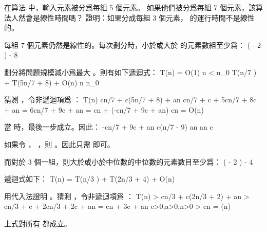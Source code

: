 \startsection[
  title={Selection in worst-case linear time},
  reference=section:worstcase_linear_selection,
]

\startEXERCISE
在算法  中，輸入元素被分爲每組 5 個元素。
如果他們被分爲每組 7 個元素，該算法人然會是線性時間嗎？
證明：如果分成每組 3 個元素，  的運行時間不是線性的。
\stopEXERCISE

\startANSWER
每組 7 個元素仍然是線性的。每次劃分時，小於或大於  的元素數組至少爲：
 \left(\left\lceil {} \left\lceil {} \right\rceil \right\rceil
           - 2 \right) \ge {} - 8
\stopformula

劃分將問題規模減小爲最大 。則有如下遞迴式：
\startformula
T(n) = \startmathcases
 \NC O(1) \MC {} n < n_0 \NR
 \NC T(\lceil n/7 \rceil) + T(5n/7 + 8) + O(n) \MC {} n \ge n_0 \NR
\stopmathcases
\stopformula

猜測 ，令非遞迴項爲 ：
\startformula\startmathalignment
\NC T(n) \NC \le c\lceil n/7 \rceil + c(5n/7 + 8) + an \NR
\NC \NC \le cn/7 + c + 5cn/7 + 8c + an \NR
\NC \NC = 6cn/7 + 9c + an \NR
\NC \NC = cn + (-cn/7 + 9c + an) \NR
\NC \NC \le cn \NR
\NC \NC = O(n) \NR
\stopmathalignment\stopformula

當  時，最後一步成立。因此：
\startformula\startmathalignment[n=1]
\NC -cn/7 + 9c + an  \NR
\NC \Downarrow \NR
\NC c(n/7 - 9) \ge an \NR
\NC \Downarrow \NR
\NC {} \ge an \NR
\NC \Downarrow \NR
\NC c \ge {} \NR
\stopmathalignment\stopformula

如果令 ， ，則 。因此只需  即可。

而對於 3 個一組，則大於或小於中位數的中位數的元素數目至少爲：
 \left(\left\lceil {} \left\lceil {} \right\rceil \right\rceil
           - 2 \right) \ge {} - 4
\stopformula

遞迴式如下：
\startformula
T(n) = T(\lceil n/3 \rceil) + T(2n/3 + 4) + O(n)
\stopformula

用代入法證明 。猜測 ，令非遞迴項爲 ：
\startformula\startmathalignment
\NC T(n) \NC > c\lceil n/3 \rceil + c(2n/3 + 2) + an \NR
\NC \NC > cn/3 + c + 2cn/3 + 2c + an \NR
\NC \NC = cn + 3c + an \qquad c>0,a>0,n>0\NR
\NC \NC > cn \NR
\NC \NC = \omega(n) \NR
\stopmathalignment\stopformula

上式對所有  都成立。
\stopANSWER

